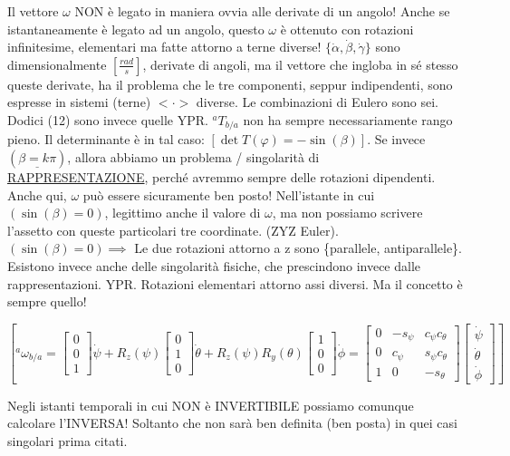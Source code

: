 Il vettore $\omega$ NON è legato in maniera ovvia alle derivate di un angolo! Anche se istantaneamente è legato ad un angolo, questo $\omega$ è ottenuto con rotazioni infinitesime, elementari ma fatte attorno a terne diverse! $\{\dot{\alpha},\dot{\beta},\dot{\gamma}\}$ sono dimensionalmente $[\frac{rad}{s}]$, derivate di angoli, ma il vettore che ingloba in sé stesso queste derivate, ha il problema che le tre componenti, seppur indipendenti, sono espresse in sistemi (terne) $<\mathord{\cdot}>$ diverse. Le combinazioni di Eulero sono sei. Dodici (12) sono invece quelle YPR. $^aT_{b/a}$ non ha sempre necessariamente rango pieno. Il determinante è in tal caso: $[\det{T(\varphi)} = -\sin(\beta)]$. Se invece $(\underline{\beta=k\pi})$, allora abbiamo un problema / singolarità di \underline{RAPPRESENTAZIONE}, perché avremmo sempre delle rotazioni dipendenti. Anche qui, $\omega$ può essere sicuramente ben posto! Nell'istante in cui $(\sin(\beta)=0)$, legittimo anche il valore di $\omega$, ma non possiamo scrivere l'assetto con queste particolari tre coordinate. (ZYZ Euler). $(\sin(\beta)=0)\implies$ Le due rotazioni attorno a z sono \{parallele, antiparallele\}. Esistono invece anche delle singolarità fisiche, che prescindono invece dalle rappresentazioni. YPR. Rotazioni elementari attorno assi diversi. Ma il concetto è sempre quello! 

\[
	[^a\omega_{b/a} = \begin{bmatrix}0\\0\\1\end{bmatrix}\dot{\psi} + R_z(\psi)\begin{bmatrix}0\\1\\0\end{bmatrix}\dot{\theta} + R_z(\psi)R_y(\theta)\begin{bmatrix}1\\0\\0\end{bmatrix}\dot{\phi} = \begin{bmatrix}0&-s_\psi&c_\psi c_\theta\\0&c_\psi&s_\psi c_\theta\\1&0&-s_\theta\end{bmatrix}\begin{bmatrix}\dot{\psi}\\\dot{\theta}\\\dot{\phi}\end{bmatrix}]
\]

Negli istanti temporali in cui NON è INVERTIBILE possiamo comunque calcolare l'INVERSA! Soltanto che non sarà ben definita (ben posta) in quei casi singolari prima citati.

